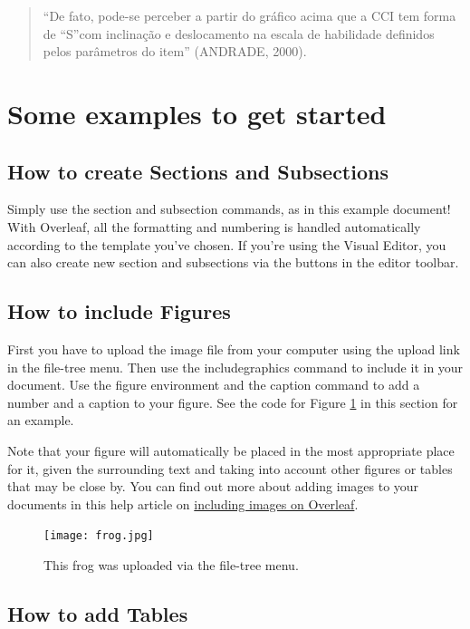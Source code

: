 \documentclass{article}
\begin{document}
\begin{quote}
    “De fato, pode-se perceber a partir do gráfico acima que a CCI tem forma de “S”com inclinação e deslocamento na escala de habilidade definidos pelos parâmetros do item” (ANDRADE, 2000).
\end{quote}

\section{Some examples to get started}

\subsection{How to create Sections and Subsections}

Simply use the section and subsection commands, as in this example document! With Overleaf, all the formatting and numbering is handled automatically according to the template you've chosen. If you're using the Visual Editor, you can also create new section and subsections via the buttons in the editor toolbar.

\subsection{How to include Figures}

First you have to upload the image file from your computer using the upload link in the file-tree menu. Then use the includegraphics command to include it in your document. Use the figure environment and the caption command to add a number and a caption to your figure. See the code for Figure \ref{fig:frog} in this section for an example.

Note that your figure will automatically be placed in the most appropriate place for it, given the surrounding text and taking into account other figures or tables that may be close by. You can find out more about adding images to your documents in this help article on \href{https://www.overleaf.com/learn/how-to/Including_images_on_Overleaf}{including images on Overleaf}.

\begin{figure}
\centering
\texttt{[image: frog.jpg]}
\caption{\label{fig:frog}This frog was uploaded via the file-tree menu.}
\end{figure}

\subsection{How to add Tables}
\end{document}
